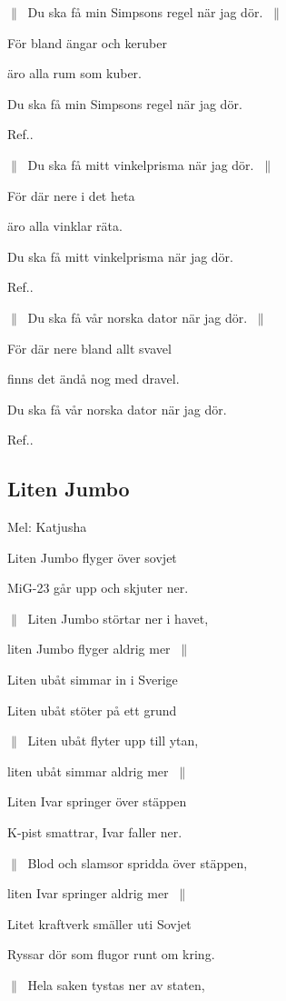 $\|\:$ Du ska få min Simpsons regel när jag dör. $\:\|$

För bland ängar och keruber

äro alla rum som kuber.

Du ska få min Simpsons regel när jag dör.\bigskip

Ref..\bigskip

$\|\:$ Du ska få mitt vinkelprisma när jag dör. $\:\|$

För där nere i det heta

äro alla vinklar räta.

Du ska få mitt vinkelprisma när jag dör.\bigskip

Ref..\bigskip

$\|\:$ Du ska få vår norska dator när jag dör. $\:\|$

För där nere bland allt svavel

finns det ändå nog med dravel.

Du ska få vår norska dator när jag dör.\bigskip

Ref.. \bigskip


\subsection{\textbf{Liten Jumbo}}

Mel: Katjusha \bigskip


Liten Jumbo flyger över sovjet

MiG-23 går upp och skjuter ner.

$\|\:$ Liten Jumbo störtar ner i havet,

liten Jumbo flyger aldrig mer $\:\|$ \bigskip

Liten ubåt simmar in i Sverige

Liten ubåt stöter på ett grund

$\|\:$ Liten ubåt flyter upp till ytan,

liten ubåt simmar aldrig mer $\:\|$\bigskip

Liten Ivar springer över stäppen

K-pist smattrar, Ivar faller ner.

$\|\:$ Blod och slamsor spridda över stäppen,

liten Ivar springer aldrig mer $\:\|$\bigskip

Litet kraftverk smäller uti Sovjet

Ryssar dör som flugor runt om kring.

$\|\:$ Hela saken tystas ner av staten,

